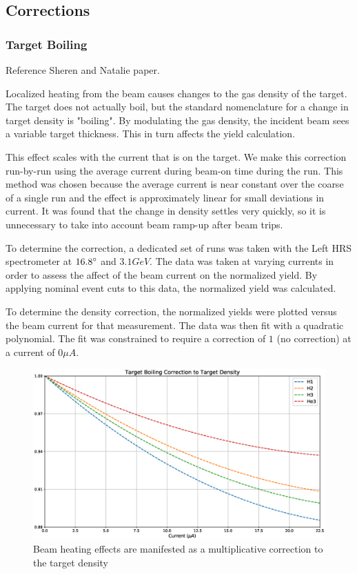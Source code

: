 \subsection{Corrections}

\subsubsection{Target Boiling}

Reference Sheren and Natalie paper.

Localized heating from the beam causes changes to the gas density of the target. The target does not actually boil, but the standard nomenclature for a change in target density is "boiling". By modulating the gas density, the incident beam sees a variable target thickness. This in turn affects the yield calculation.

This effect scales with the current that is on the target. We make this correction run-by-run using the average current during beam-on time during the run. This method was chosen because the average current is near constant over the coarse of a single run and the effect is approximately linear for small deviations in current. It was found that the change in density settles very quickly, so it is unnecessary to take into account beam ramp-up after beam trips.

To determine the correction, a dedicated set of runs was taken with the Left HRS spectrometer at $16.8\degree$ and $3.1GeV$. The data was taken at varying currents in order to assess the affect of the beam current on the normalized yield. By applying nominal event cuts to this data, the normalized yield was calculated. 

To determine the density correction, the normalized yields were plotted versus the beam current for that measurement. The data was then fit with a quadratic polynomial. The fit was constrained to require a correction of $1$ (no correction) at a current of $0 \mu A$.

\begin{figure}
	\includegraphics[width=\textwidth]{./chap3-analysis/fig/boil_cor.eps}
	\caption{Beam heating effects are manifested as a multiplicative correction to the target density}
	\label{fig:boilcor}
\end{figure}


